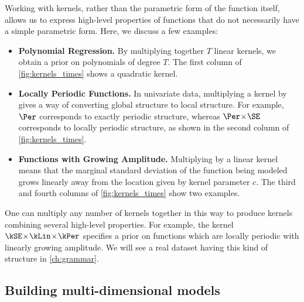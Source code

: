 Working with kernels, rather than the parametric form of the function itself, allows us to express high-level properties of functions that do not necessarily have a simple parametric form.
Here, we discuss a few examples:

\begin{itemize}
\item {\bf Polynomial Regression.}
By multiplying together $T$ linear kernels, we obtain a prior on polynomials of degree $T$.
The first column of \cref{fig:kernels_times} shows a quadratic kernel.

\item {\bf Locally Periodic Functions.}
In univariate data, multiplying a kernel by \kSE{} gives a way of converting global structure to local structure.
For example, $\Per$ corresponds to exactly periodic structure, whereas $\Per \kerntimes \SE$ corresponds to locally periodic structure, as shown in the second column of \cref{fig:kernels_times}.

\item {\bf Functions with Growing Amplitude.}
Multiplying by a linear kernel means that the marginal standard deviation of the function being modeled grows linearly away from the location given by kernel parameter $c$.
The third and fourth columns of \cref{fig:kernels_times} show two examples.
\end{itemize}

One can multiply any number of kernels together in this way to produce kernels combining several high-level properties.
For example, the kernel $\kSE \kerntimes \kLin \kerntimes \kPer$ specifies a prior on functions which are locally periodic with linearly growing amplitude.
We will see a real dataset having this kind of structure in \cref{ch:grammar}.


\subsection{Building multi-dimensional models}


